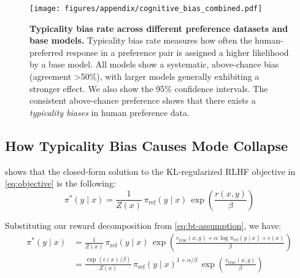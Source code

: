
  \begin{figure}[!htbp]
      \centering
      \texttt{[image: figures/appendix/cognitive\_bias\_combined.pdf]}
      \caption{\textbf{Typicality bias rate across different preference datasets and base models.} Typicality bias rate measures how often the human-preferred response in a preference pair is assigned a higher likelihood by a base model. 
      All models show a systematic, above-chance bias (agreement >50\%), with larger models generally exhibiting a stronger effect.
      We also show the 95\% confidence intervals. 
      The consistent above-chance preference shows that there exists a \textit{typicality biases} in human preference data. 
  }
      \label{fig:cognitive_bias_panels}
  \end{figure}
  
\subsection{How Typicality Bias Causes Mode Collapse}
\label{app:power-sharpening}

\cite{rafailov2024directpreferenceoptimizationlanguage} shows that the closed-form solution to the KL-regularized RLHF objective in \eqref{eq:objective} is the following:
\begin{equation}
\pi^*(y\mid x) = \frac{1}{Z(x)}\,\pi_{\mathrm{ref}}(y\mid x)\,\exp\!\left(\frac{r(x,y)}{\beta}\right)
\end{equation}

Substituting our reward decomposition from \eqref{eq:bt-assumption}, we have:
\begin{align}
\pi^*(y\mid x) &= \frac{1}{Z(x)}\,\pi_{\mathrm{ref}}(y\mid x)\,\exp\!\left(\frac{r_{\text{true}}(x,y) + \alpha\,\log \pi_{\mathrm{ref}}(y\mid x) + \epsilon(x)}{\beta}\right) \nonumber\\
&= \frac{\exp(\epsilon(x)/\beta)}{Z(x)}\,\pi_{\mathrm{ref}}(y\mid x)^{1+\alpha/\beta}\,\exp\!\left(\frac{r_{\text{true}}(x,y)}{\beta}\right)
\end{align}

